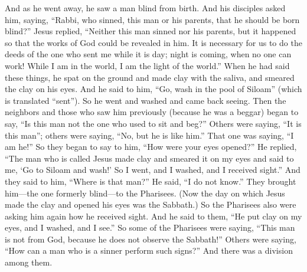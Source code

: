 \begin{biblechapter} %
 And as he went away, he saw a man blind from birth.
\verse And his disciples asked him, saying, “Rabbi, who sinned, this man or his parents, that he should be born blind?”
\verse Jesus replied, “Neither this man sinned nor his parents, but it happened so that the works of God could be revealed in him.
\verse It is necessary for us to do the deeds of the one who sent me while it is day; night is coming, when no one can work!
\verse While I am in the world, I am the light of the world.”
\verse When he had said these things, he spat on the ground and made clay with the saliva, and smeared the clay on his eyes.
\verse And he said to him, “Go, wash in the pool of Siloam” (which is translated “sent”). So he went and washed and came back seeing.
\verse Then the neighbors and those who saw him previously (because he was a beggar) began to say, “Is this man not the one who used to sit and beg?”
\verse Others were saying, “It is this man”; others were saying, “No, but he is like him.” That one was saying, “I am he!”
\verse So they began to say to him, “How were your eyes opened?”
\verse He replied, “The man who is called Jesus made clay and smeared it on my eyes and said to me, ‘Go to Siloam and wash!’ So I went, and I washed, and I received sight.”
\verse And they said to him, “Where is that man?” He said, “I do not know.”
 They brought him—the one formerly blind—to the Pharisees.
\verse (Now the day on which Jesus made the clay and opened his eyes was the Sabbath.)
\verse So the Pharisees also were asking him again how he received sight. And he said to them, “He put clay on my eyes, and I washed, and I see.”
\verse So some of the Pharisees were saying, “This man is not from God, because he does not observe the Sabbath!” Others were saying, “How can a man who is a sinner perform such signs?” And there was a division among them.

\end{biblechapter}
